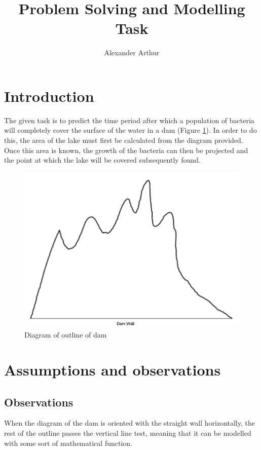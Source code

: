 \documentclass{article}
\title{Problem Solving and Modelling Task}
\author{Alexander Arthur}
\begin{document}
\maketitle
\setcounter{tocdepth}{1}
\tableofcontents

\section{Introduction}
    The given task is to predict the time period after which a population of bacteria will completely cover the surface of the water in a dam (Figure \ref{figDamOutline}). In order to do this, the area of the lake must first be calculated from the diagram provided. Once this area is known, the growth of the bacteria can then be projected and the point at which the lake will be covered subsequently found.

    \begin{figure}
        \centering
        \includegraphics[width = 12cm]{damDiagram.png}
        \caption{Diagram of outline of dam}
        \label{figDamOutline}
    \end{figure}



\section{Assumptions and observations}

    \subsection{Observations}

    When the diagram of the dam is oriented with the straight wall horizontally, the rest of the outline passes the vertical line test, meaning that it can be modelled with some sort of mathematical function.
\end{document}
